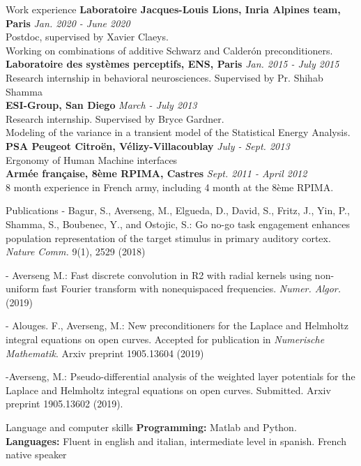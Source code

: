 \documentclass{resume} %
\begin{document}
\begin{rSection}{Work experience}
{\bf Laboratoire Jacques-Louis Lions, Inria Alpines team, Paris} \hfill {\em Jan. 2020 - June 2020} \\
Postdoc, supervised by Xavier Claeys. \\
Working on combinations of additive Schwarz and Calder\'{o}n preconditioners.\\
{\bf Laboratoire des systèmes perceptifs, ENS, Paris} \hfill {\em Jan. 2015 - July 2015} 
\\ Research internship in behavioral neurosciences. Supervised by Pr. Shihab Shamma\\ 
{\bf ESI-Group, San Diego}
\hfill {\em March - July 2013} \\
Research internship. Supervised by Bryce Gardner. \\Modeling of the variance in a transient model of the Statistical Energy Analysis. \\
{\bf PSA Peugeot Citroën, Vélizy-Villacoublay} \hfill{\em July - Sept. 2013} \\
Ergonomy of Human Machine interfaces \\
{\bf Armée française, 8ème RPIMA, Castres}  \hfill{\em Sept. 2011 - April 2012}\\
8 month experience in French army, including 4 month at the 8ème RPIMA. 
\end{rSection}

\begin{rSection}{Publications}
- Bagur, S., Averseng, M., Elgueda, D., David, S., Fritz, J., Yin, P., Shamma, S., Boubenec, Y., and Ostojic, S.: Go no-go task engagement enhances population representation of the target stimulus in primary auditory cortex. {\em Nature Comm.} 9(1), 2529 (2018)

- Averseng M.: Fast discrete convolution in R2
with radial kernels using non-uniform fast Fourier transform with nonequispaced frequencies. {\em Numer. Algor.} (2019)

- Alouges. F., Averseng, M.: New preconditioners for the Laplace and Helmholtz integral equations on open curves. Accepted for publication in {\em Numerische Mathematik}. Arxiv preprint 1905.13604 (2019)

-Averseng, M.: Pseudo-differential analysis of the weighted layer potentials for the Laplace and Helmholtz integral equations on open curves. Submitted. Arxiv preprint 1905.13602 (2019).
\end{rSection}


\begin{rSection}{Language and computer skills}
{\bf Programming:}  {Matlab and Python.} \\
{\bf Languages:}  {Fluent in english and italian, intermediate level in spanish. French native speaker}
\end{rSection}
\end{document}
